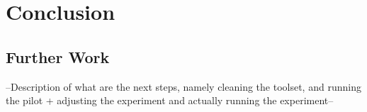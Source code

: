 
\chapter{Conclusion} %

\label{Chapter6}

\section{Further Work}

--Description of what are the next steps, namely cleaning the toolset, and running the pilot + adjusting the experiment and actually running the experiment--
